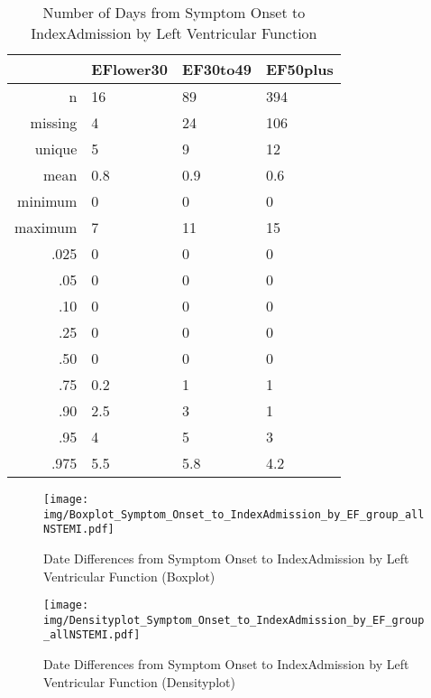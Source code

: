 \documentclass[a4paper]{report}
\begin{document}
\begin{itemize}
{%
\begin{table}[ht]
\centering
\begin{tabular}{rlll}
  \toprule
 & EFlower30 & EF30to49 & EF50plus \\ 
  \midrule
n & 16 & 89 & 394 \\ 
  missing & 4 & 24 & 106 \\ 
  unique & 5 & 9 & 12 \\ 
  mean & 0.8 & 0.9 & 0.6 \\ 
  minimum & 0 & 0 & 0 \\ 
  maximum & 7 & 11 & 15 \\ 
  .025 & 0 & 0 & 0 \\ 
  .05 & 0 & 0 & 0 \\ 
  .10 & 0 & 0 & 0 \\ 
  .25 & 0 & 0 & 0 \\ 
  .50 & 0 & 0 & 0 \\ 
  .75 & 0.2 & 1 & 1 \\ 
  .90 & 2.5 & 3 & 1 \\ 
  .95 & 4 & 5 & 3 \\ 
  .975 & 5.5 & 5.8 & 4.2 \\ 
   \bottomrule
\end{tabular}
\caption{Number of Days from Symptom Onset to IndexAdmission by Left Ventricular Function} 
\end{table}
\begin{figure}
  \centering
  \caption{Date Differences from Symptom Onset to IndexAdmission by Left Ventricular Function (Boxplot)}
  \label{Boxplot: Date Differences from Symptom Onset to IndexAdmission by Left Ventricular Function}
\texttt{[image: img/Boxplot\_Symptom\_Onset\_to\_IndexAdmission\_by\_EF\_group\_allNSTEMI.pdf]}\end{figure}


\begin{figure}
  \centering
  \caption{Date Differences from Symptom Onset to IndexAdmission by Left Ventricular Function (Densityplot)}
  \label{Density: Date Differences from Symptom Onset to IndexAdmission by Left Ventricular Function}
\texttt{[image: img/Densityplot\_Symptom\_Onset\_to\_IndexAdmission\_by\_EF\_group\_allNSTEMI.pdf]}\end{figure}


\clearpage

}
\end{itemize}
\end{document}
